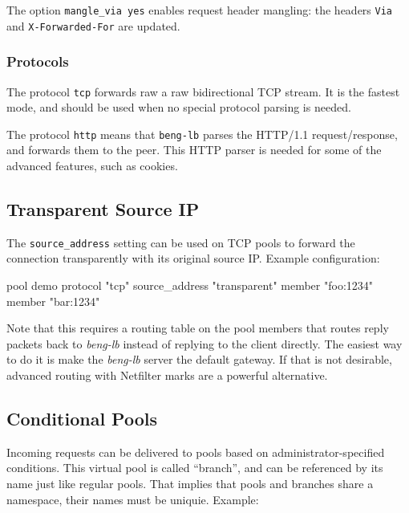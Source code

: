 \documentclass[a4paper,12pt]{article}
\begin{document}
The option \texttt{mangle\_via yes} enables request header mangling:
the headers \texttt{Via} and \texttt{X-Forwarded-For} are updated.

\subsubsection{Protocols}

The protocol \texttt{tcp} forwards raw a raw bidirectional TCP stream.
It is the fastest mode, and should be used when no special protocol
parsing is needed.

The protocol \texttt{http} means that \texttt{beng-lb} parses the
HTTP/1.1 request/response, and forwards them to the peer.  This HTTP
parser is needed for some of the advanced features, such as cookies.

\subsection{Transparent Source IP}

The \verb|source_address| setting can be used on TCP pools to forward
the connection transparently with its original source IP.  Example
configuration:

\begin{verbatim*}
pool demo {
  protocol "tcp"
  source_address "transparent"
  member "foo:1234"
  member "bar:1234"
}
\end{verbatim*}

Note that this requires a routing table on the pool members that
routes reply packets back to \emph{beng-lb} instead of replying to the
client directly.  The easiest way to do it is make the \emph{beng-lb}
server the default gateway.  If that is not desirable, advanced
routing with Netfilter marks are a powerful alternative.

\subsection{Conditional Pools}

Incoming requests can be delivered to pools based on
administrator-specified conditions.  This virtual pool is called
``branch'', and can be referenced by its name just like regular pools.
That implies that pools and branches share a namespace, their names
must be uniquie.  Example:

\end{document}
